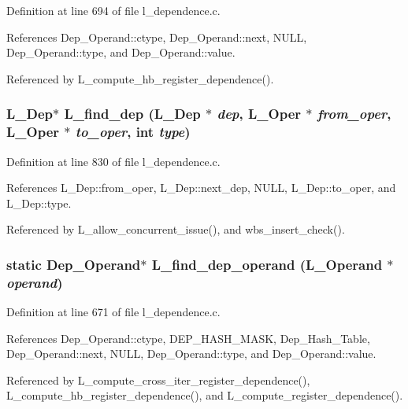 Definition at line 694 of file l\_\-dependence.c.

References Dep\_\-Operand::ctype, Dep\_\-Operand::next, NULL, Dep\_\-Operand::type, and Dep\_\-Operand::value.

Referenced by L\_\-compute\_\-hb\_\-register\_\-dependence().
\subsubsection{\setlength{\rightskip}{0pt plus 5cm}\bf{L\_\-Dep}$\ast$ L\_\-find\_\-dep (\bf{L\_\-Dep} $\ast$ {\em dep}, L\_\-Oper $\ast$ {\em from\_\-oper}, L\_\-Oper $\ast$ {\em to\_\-oper}, int {\em type})}\label{l__dependence_8c_f0ec9a2ae2398967737febf3f6bde466}




Definition at line 830 of file l\_\-dependence.c.

References L\_\-Dep::from\_\-oper, L\_\-Dep::next\_\-dep, NULL, L\_\-Dep::to\_\-oper, and L\_\-Dep::type.

Referenced by L\_\-allow\_\-concurrent\_\-issue(), and wbs\_\-insert\_\-check().
\subsubsection{\setlength{\rightskip}{0pt plus 5cm}static \bf{Dep\_\-Operand}$\ast$ L\_\-find\_\-dep\_\-operand (L\_\-Operand $\ast$ {\em operand})\hspace{0.3cm}{\tt  [static]}}\label{l__dependence_8c_242a2eeabb1652403af84b38c21e2d9d}




Definition at line 671 of file l\_\-dependence.c.

References Dep\_\-Operand::ctype, DEP\_\-HASH\_\-MASK, Dep\_\-Hash\_\-Table, Dep\_\-Operand::next, NULL, Dep\_\-Operand::type, and Dep\_\-Operand::value.

Referenced by L\_\-compute\_\-cross\_\-iter\_\-register\_\-dependence(), L\_\-compute\_\-hb\_\-register\_\-dependence(), and L\_\-compute\_\-register\_\-dependence().
